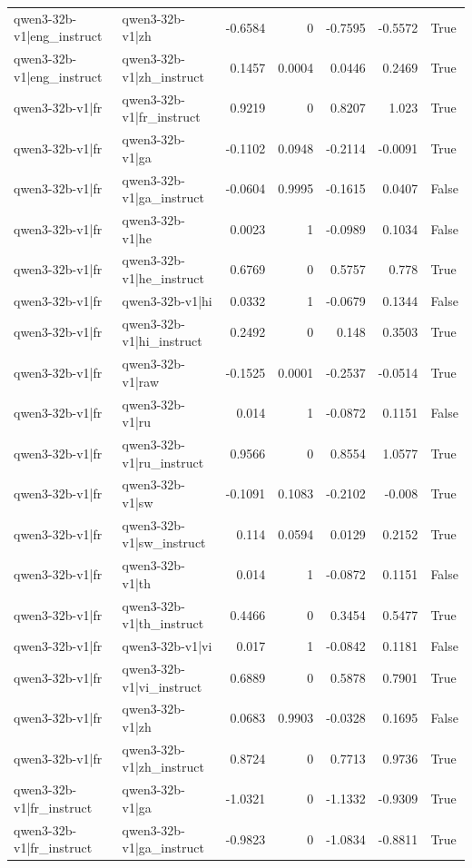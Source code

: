 \begin{table}
\begin{tabular}{l l r r r r l}
qwen3-32b-v1|eng_instruct & qwen3-32b-v1|zh & -0.6584 & 0 & -0.7595 & -0.5572 & True \\
qwen3-32b-v1|eng_instruct & qwen3-32b-v1|zh_instruct & 0.1457 & 0.0004 & 0.0446 & 0.2469 & True \\
qwen3-32b-v1|fr & qwen3-32b-v1|fr_instruct & 0.9219 & 0 & 0.8207 & 1.023 & True \\
qwen3-32b-v1|fr & qwen3-32b-v1|ga & -0.1102 & 0.0948 & -0.2114 & -0.0091 & True \\
qwen3-32b-v1|fr & qwen3-32b-v1|ga_instruct & -0.0604 & 0.9995 & -0.1615 & 0.0407 & False \\
qwen3-32b-v1|fr & qwen3-32b-v1|he & 0.0023 & 1 & -0.0989 & 0.1034 & False \\
qwen3-32b-v1|fr & qwen3-32b-v1|he_instruct & 0.6769 & 0 & 0.5757 & 0.778 & True \\
qwen3-32b-v1|fr & qwen3-32b-v1|hi & 0.0332 & 1 & -0.0679 & 0.1344 & False \\
qwen3-32b-v1|fr & qwen3-32b-v1|hi_instruct & 0.2492 & 0 & 0.148 & 0.3503 & True \\
qwen3-32b-v1|fr & qwen3-32b-v1|raw & -0.1525 & 0.0001 & -0.2537 & -0.0514 & True \\
qwen3-32b-v1|fr & qwen3-32b-v1|ru & 0.014 & 1 & -0.0872 & 0.1151 & False \\
qwen3-32b-v1|fr & qwen3-32b-v1|ru_instruct & 0.9566 & 0 & 0.8554 & 1.0577 & True \\
qwen3-32b-v1|fr & qwen3-32b-v1|sw & -0.1091 & 0.1083 & -0.2102 & -0.008 & True \\
qwen3-32b-v1|fr & qwen3-32b-v1|sw_instruct & 0.114 & 0.0594 & 0.0129 & 0.2152 & True \\
qwen3-32b-v1|fr & qwen3-32b-v1|th & 0.014 & 1 & -0.0872 & 0.1151 & False \\
qwen3-32b-v1|fr & qwen3-32b-v1|th_instruct & 0.4466 & 0 & 0.3454 & 0.5477 & True \\
qwen3-32b-v1|fr & qwen3-32b-v1|vi & 0.017 & 1 & -0.0842 & 0.1181 & False \\
qwen3-32b-v1|fr & qwen3-32b-v1|vi_instruct & 0.6889 & 0 & 0.5878 & 0.7901 & True \\
qwen3-32b-v1|fr & qwen3-32b-v1|zh & 0.0683 & 0.9903 & -0.0328 & 0.1695 & False \\
qwen3-32b-v1|fr & qwen3-32b-v1|zh_instruct & 0.8724 & 0 & 0.7713 & 0.9736 & True \\
qwen3-32b-v1|fr_instruct & qwen3-32b-v1|ga & -1.0321 & 0 & -1.1332 & -0.9309 & True \\
qwen3-32b-v1|fr_instruct & qwen3-32b-v1|ga_instruct & -0.9823 & 0 & -1.0834 & -0.8811 & True \\

\end{tabular}
\end{table}
